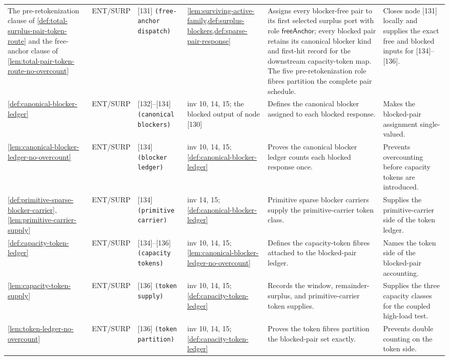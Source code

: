 \documentclass[11pt]{article}
\begin{document}
{\begin{longtable}{L{0.10\textwidth} C{0.045\textwidth} L{0.13\textwidth} L{0.135\textwidth} L{0.28\textwidth} L{0.20\textwidth}}
The pre-retokenization clause of \cref{def:total-surplus-pair-token-route} and the free-anchor clause of \cref{lem:total-pair-token-route-no-overcount} & ENT\slash SURP & [131] \texttt{(free-anchor dispatch)} & \cref{lem:surviving-active-family,def:surplus-blockers,def:sparse-pair-response} & Assigns every blocker-free pair to its first selected surplus port with role \(\mathsf{freeAnchor}\); every blocked pair retains its canonical blocker kind and first-hit record for the downstream capacity-token map.  The five pre-retokenization role fibres partition the complete pair schedule. & Closes node [131] locally and supplies the exact free and blocked inputs for [134]--[136]. \\
\cref{def:canonical-blocker-ledger} & ENT\slash SURP & [132]--[134] \texttt{(canonical blockers)} & inv 10, 14, 15; the blocked output of node [130] & Defines the canonical blocker assigned to each blocked response. & Makes the blocked-pair assignment single-valued. \\
\cref{lem:canonical-blocker-ledger-no-overcount} & ENT\slash SURP & [134] \texttt{(blocker ledger)} & inv 10, 14, 15; \cref{def:canonical-blocker-ledger} & Proves the canonical blocker ledger counts each blocked response once. & Prevents overcounting before capacity tokens are introduced. \\
\cref{def:primitive-sparse-blocker-carrier}, \cref{lem:primitive-carrier-supply} & ENT\slash SURP & [134] \texttt{(primitive carrier)} & inv 14, 15; \cref{def:canonical-blocker-ledger} & Primitive sparse blocker carriers supply the primitive-carrier token class. & Supplies the primitive-carrier side of the token ledger. \\
\cref{def:capacity-token-ledger} & ENT\slash SURP & [134]--[136] \texttt{(capacity tokens)} & inv 10, 14, 15; \cref{lem:canonical-blocker-ledger-no-overcount} & Defines the capacity-token fibres attached to the blocked-pair ledger. & Names the token side of the blocked-pair accounting. \\
\cref{lem:capacity-token-supply} & ENT\slash SURP & [136] \texttt{(token supply)} & inv 10, 14, 15; \cref{def:capacity-token-ledger} & Records the window, remainder-surplus, and primitive-carrier token supplies. & Supplies the three capacity classes for the coupled high-load test. \\
\cref{lem:token-ledger-no-overcount} & ENT\slash SURP & [136] \texttt{(token partition)} & inv 10, 14, 15; \cref{def:capacity-token-ledger} & Proves the token fibres partition the blocked-pair set exactly. & Prevents double counting on the token side. \\

\end{longtable}}
\end{document}
